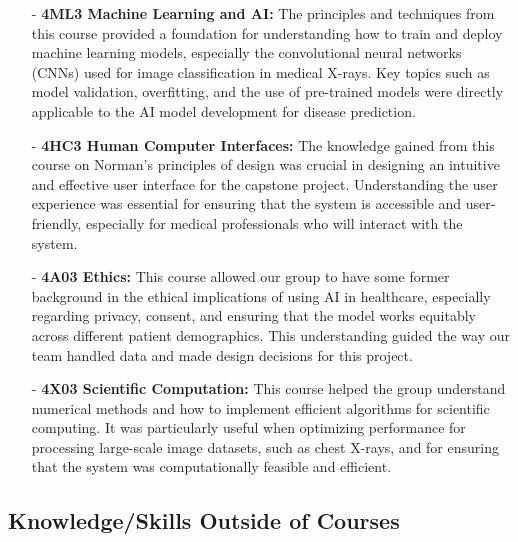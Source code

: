 \documentclass{article}
\begin{document}
\begin{itemize}
    \item[-] \textbf{4ML3 Machine Learning and AI:} The principles and techniques from this course provided a foundation for understanding how to train and deploy machine learning models, especially the convolutional neural networks (CNNs) used for image classification in medical X-rays. Key topics such as model validation, overfitting, and the use of pre-trained models were directly applicable to the AI model development for disease prediction.
    
    \item[-] \textbf{4HC3 Human Computer Interfaces:} The knowledge gained from this course on Norman's principles of design was crucial in designing an intuitive and effective user interface for the capstone project. Understanding the user experience was essential for ensuring that the system is accessible and user-friendly, especially for medical professionals who will interact with the system.
    
    \item[-] \textbf{4A03 Ethics:} This course allowed our group to have some former background in the ethical implications of using AI in healthcare, especially regarding privacy, consent, and ensuring that the model works equitably across different patient demographics. This understanding guided the way our team handled data and made design decisions for this project.
    
    \item[-] \textbf{4X03 Scientific Computation:} This course helped the group understand numerical methods and how to implement efficient algorithms for scientific computing. It was particularly useful when optimizing performance for processing large-scale image datasets, such as chest X-rays, and for ensuring that the system was computationally feasible and efficient.

\end{itemize}

\subsection{Knowledge/Skills Outside of Courses}
\end{document}

